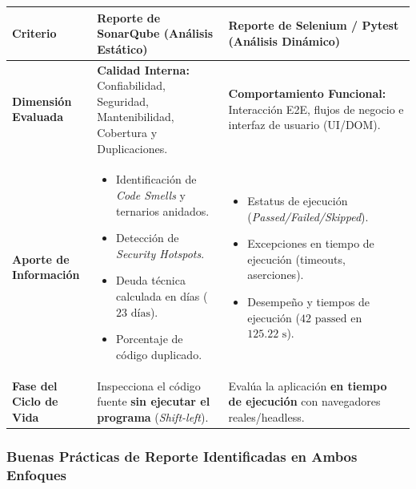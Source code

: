 \documentclass[12pt, letterpaper]{article}
\begin{document}
\begin{table}[h!]
\centering
\small
\renewcommand{\arraystretch}{1.4}
\begin{tabularx}{\textwidth}{>{\bfseries\color{blue!70!black}}p{3cm} X X}
\toprule
\textbf{Criterio} & \textbf{Reporte de SonarQube (Análisis Estático)} & \textbf{Reporte de Selenium / Pytest (Análisis Dinámico)} \\
\midrule
Dimensión Evaluada & 
\textbf{Calidad Interna:} Confiabilidad, Seguridad, Mantenibilidad, Cobertura y Duplicaciones. & 
\textbf{Comportamiento Funcional:} Interacción E2E, flujos de negocio e interfaz de usuario (UI/DOM). \\
\hline
Aporte de Información & 
\begin{itemize}[leftmargin=*,noitemsep,topsep=0pt]
    \item Identificación de \textit{Code Smells} y ternarios anidados.
    \item Detección de \textit{Security Hotspots}.
    \item Deuda técnica calculada en días ($23\text{ días}$).
    \item Porcentaje de código duplicado.
\end{itemize} & 
\begin{itemize}[leftmargin=*,noitemsep,topsep=0pt]
    \item Estatus de ejecución (\textit{Passed/Failed/Skipped}).
    \item Excepciones en tiempo de ejecución (timeouts, aserciones).
    \item Desempeño y tiempos de ejecución ($42\text{ passed}$ en $125.22\text{ s}$).
\end{itemize} \\
\hline
Fase del Ciclo de Vida & 
Inspecciona el código fuente \textbf{sin ejecutar el programa} (\textit{Shift-left}). & 
Evalúa la aplicación \textbf{en tiempo de ejecución} con navegadores reales/headless. \\
\bottomrule
\end{tabularx}
\end{table}

\subsubsection{Buenas Prácticas de Reporte Identificadas en Ambos Enfoques}
\end{document}
